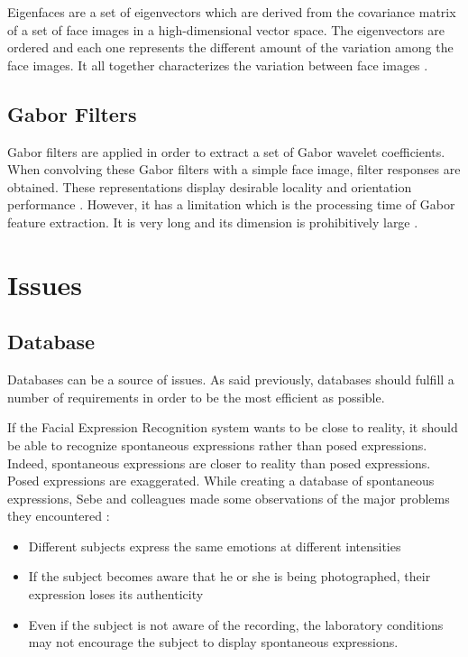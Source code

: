 \vspace{\baselineskip}
\noindent Eigenfaces are a set of eigenvectors which are derived from the covariance matrix of a set of face images in a high-dimensional vector space. The eigenvectors are ordered and each one represents the different amount of the variation among the face images. It all together characterizes the variation between face images \cite{TUR91}.
\newline

\subsection{Gabor Filters}

\vspace{\baselineskip}
\noindent Gabor filters are applied in order to extract a set of Gabor wavelet coefficients. When convolving these Gabor filters with a simple face image, filter responses are obtained. These representations display desirable locality and orientation performance \cite{JEM09}. However, it has a limitation which is the processing time of Gabor feature extraction. It is very long and its dimension is prohibitively large \cite{PRA09}.
\newline

\section{Issues}

\subsection{Database}

\vspace{\baselineskip}
\noindent Databases can be a source of issues. As said previously, databases should fulfill a number of requirements in order to be the most efficient as possible. 
\newline

\noindent If the Facial Expression Recognition system wants to be close to reality, it should be able to recognize spontaneous expressions rather than posed expressions. Indeed, spontaneous expressions are closer to reality than posed expressions. Posed expressions are exaggerated. While creating a database of spontaneous expressions, Sebe and colleagues \cite{SEB07} made some observations of the major problems they encountered \cite{BET12}:
\newline
\begin{itemize}
  \item Different subjects express the same emotions at different intensities
  \item If the subject becomes aware that he or she is being photographed, their expression loses its authenticity
  \item Even if the subject is not aware of the recording, the laboratory conditions may not encourage the subject to display spontaneous expressions.
\end{itemize}

